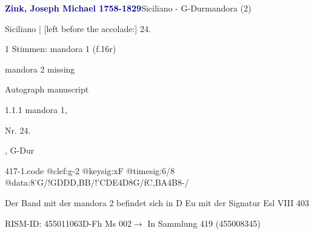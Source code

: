 \documentclass[twocolumn]{book}
\begin{document}
\par \vspace{7pt} \textcolor{darkblue}{\textbf{Zink, Joseph Michael  1758-1829}}\hfillplus{\textbf{[417]}}\newline Siciliano - G-Dur\newline mandora (2)
\par \begin{itshape}[f.16r, at left:] Siciliano | [left before the accolade:] 24.\end{itshape} 
\par \textcolor{darkblue}{}  1 Stimmen: mandora 1  (f.16r)\newline \begin{small} mandora 2 missing\end{small} \newline Autograph manuscript
\par 1.1.1  mandora 1, \begin{itshape}Nr. 24.\end{itshape}, G-Dur  
\begin{filecontents*}{417-1.code}
@clef:g-2
@keysig:xF
@timesig:6/8
@data:8'G/!GDDD,BB/!'CDE4D8G/fC,BA4B8-/
\end{filecontents*}
\newline
%
\par Der Band mit der mandora 2 befindet sich in D Eu mit der Signatur Esl VIII 403
\par RISM-ID: 455011063\newline D-Fh  Ms 002\newline $\rightarrow$ In Sammlung 419 (455008345)
      
\end{document}
